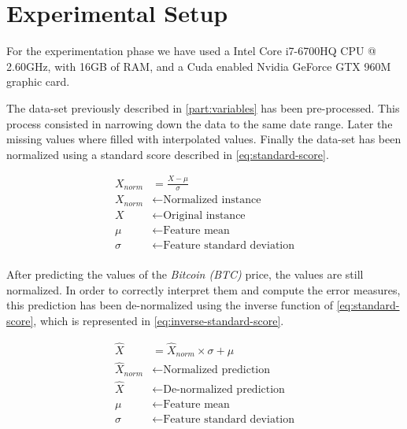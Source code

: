 
\chapter{Experimental Setup}
\label{ch:experimental-setup}

For the experimentation phase we have used a Intel Core i7-6700HQ CPU
@ 2.60GHz, with 16GB of RAM, and a Cuda enabled Nvidia GeForce GTX
960M graphic card.

The data-set previously described in \autoref{part:variables} has been
pre-processed. This process consisted in narrowing down the data to
the same date range. Later the missing values where filled with
interpolated values. Finally the data-set has been normalized using a
standard score described in \autoref{eq:standard-score}.

\begin{equation}
  \begin{aligned}
    \label{eq:standard-score} X_{norm} & = \frac{X-\mu}{\sigma} \\
X_{norm} & \leftarrow \text{Normalized instance} \\ X & \leftarrow
\text{Original instance} \\ \mu & \leftarrow \text{Feature mean} \\
\sigma & \leftarrow \text{Feature standard deviation} \\
  \end{aligned}
\end{equation}

After predicting the values of the \textit{Bitcoin (BTC)} price, the
values are still normalized. In order to correctly interpret them and
compute the error measures, this prediction has been de-normalized
using the inverse function of \autoref{eq:standard-score}, which is
represented in \autoref{eq:inverse-standard-score}.

\begin{equation}
  \begin{aligned}
    \label{eq:inverse-standard-score} \hat{X} & = \hat{X}_{norm}
\times \sigma + \mu \\ \hat{X}_{norm} & \leftarrow \text{Normalized
prediction} \\ \hat{X} & \leftarrow \text{De-normalized prediction} \\
\mu & \leftarrow \text{Feature mean} \\ \sigma & \leftarrow
\text{Feature standard deviation} \\
  \end{aligned}
\end{equation}

